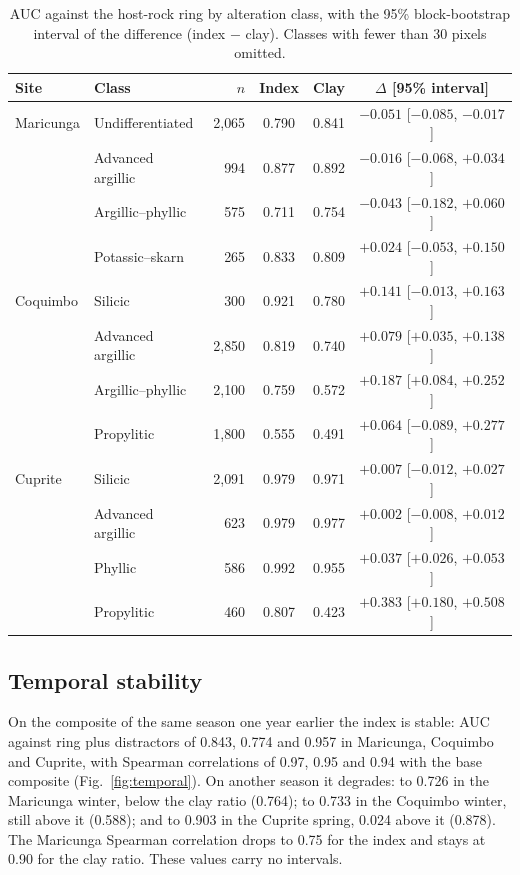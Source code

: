 \documentclass[pdflatex,sn-basic]{sn-jnl}
\begin{document}
\begin{table}[ht]
\centering
\caption{AUC against the host-rock ring by alteration class, with the 95\% block-bootstrap interval of the difference (index $-$ clay). Classes with fewer than 30 pixels omitted.}
\label{tab:classes}
\small
\footnotesize\setlength{\tabcolsep}{3pt}
\begin{tabular}{llrccc}
\toprule
Site & Class & $n$ & Index & Clay & $\Delta$ [95\% interval] \\
\midrule
Maricunga & Undifferentiated & 2{,}065 & 0.790 & 0.841 & $-0.051$ [$-0.085$, $-0.017$] \\
 & Advanced argillic & 994 & 0.877 & 0.892 & $-0.016$ [$-0.068$, $+0.034$] \\
 & Argillic--phyllic & 575 & 0.711 & 0.754 & $-0.043$ [$-0.182$, $+0.060$] \\
 & Potassic--skarn & 265 & 0.833 & 0.809 & $+0.024$ [$-0.053$, $+0.150$] \\
Coquimbo & Silicic & 300 & 0.921 & 0.780 & $+0.141$ [$-0.013$, $+0.163$] \\
 & Advanced argillic & 2{,}850 & 0.819 & 0.740 & $+0.079$ [$+0.035$, $+0.138$] \\
 & Argillic--phyllic & 2{,}100 & 0.759 & 0.572 & $+0.187$ [$+0.084$, $+0.252$] \\
 & Propylitic & 1{,}800 & 0.555 & 0.491 & $+0.064$ [$-0.089$, $+0.277$] \\
Cuprite & Silicic & 2{,}091 & 0.979 & 0.971 & $+0.007$ [$-0.012$, $+0.027$] \\
 & Advanced argillic & 623 & 0.979 & 0.977 & $+0.002$ [$-0.008$, $+0.012$] \\
 & Phyllic & 586 & 0.992 & 0.955 & $+0.037$ [$+0.026$, $+0.053$] \\
 & Propylitic & 460 & 0.807 & 0.423 & $+0.383$ [$+0.180$, $+0.508$] \\
\bottomrule
\end{tabular}
\end{table}

\subsection{Temporal stability}

On the composite of the same season one year earlier the index is stable: AUC against ring plus distractors of 0.843, 0.774 and 0.957 in Maricunga, Coquimbo and Cuprite, with Spearman correlations of 0.97, 0.95 and 0.94 with the base composite (Fig.~\ref{fig:temporal}). On another season it degrades: to 0.726 in the Maricunga winter, below the clay ratio (0.764); to 0.733 in the Coquimbo winter, still above it (0.588); and to 0.903 in the Cuprite spring, 0.024 above it (0.878). The Maricunga Spearman correlation drops to 0.75 for the index and stays at 0.90 for the clay ratio. These values carry no intervals.
\end{document}
